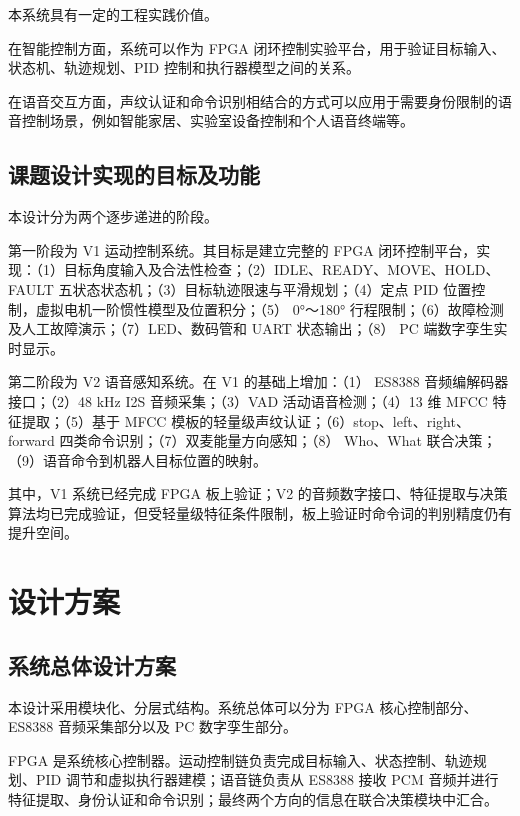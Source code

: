 \documentclass[UTF8,zihao=-4,fontset=windows]{ctexart}
\begin{document}
本系统具有一定的工程实践价值。

在智能控制方面，系统可以作为 FPGA 闭环控制实验平台，用于验证目标输入、状态机、轨迹规划、PID 控制和执行器模型之间的关系。

在语音交互方面，声纹认证和命令识别相结合的方式可以应用于需要身份限制的语音控制场景，例如智能家居、实验室设备控制和个人语音终端等。

\subsection{课题设计实现的目标及功能}

本设计分为两个逐步递进的阶段。

第一阶段为 V1 运动控制系统。其目标是建立完整的 FPGA 闭环控制平台，实现：（1）目标角度输入及合法性检查；（2）IDLE、READY、MOVE、HOLD、FAULT 五状态状态机；（3）目标轨迹限速与平滑规划；（4）定点 PID 位置控制，虚拟电机一阶惯性模型及位置积分；（5） 0°～180° 行程限制；（6）故障检测及人工故障演示；（7）LED、数码管和 UART 状态输出；（8） PC 端数字孪生实时显示。

第二阶段为 V2 语音感知系统。在 V1 的基础上增加：（1） ES8388 音频编解码器接口；（2）48 kHz I2S 音频采集；（3）VAD 活动语音检测；（4）13 维 MFCC 特征提取；（5）基于 MFCC 模板的轻量级声纹认证；（6）stop、left、right、forward 四类命令识别；（7）双麦能量方向感知；（8） Who、What 联合决策；（9）语音命令到机器人目标位置的映射。

其中，V1 系统已经完成 FPGA 板上验证；V2 的音频数字接口、特征提取与决策算法均已完成验证，但受轻量级特征条件限制，板上验证时命令词的判别精度仍有提升空间。

\section{设计方案}

\subsection{系统总体设计方案}

本设计采用模块化、分层式结构。系统总体可以分为 FPGA 核心控制部分、ES8388 音频采集部分以及 PC 数字孪生部分。

FPGA 是系统核心控制器。运动控制链负责完成目标输入、状态控制、轨迹规划、PID 调节和虚拟执行器建模；语音链负责从 ES8388 接收 PCM 音频并进行特征提取、身份认证和命令识别；最终两个方向的信息在联合决策模块中汇合。
\end{document}
